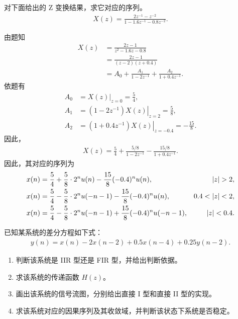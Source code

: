 \begin{exercise}
    对下面给出的 Z 变换结果，求它对应的序列。
    \begin{align*}
        X(z) = \frac{2z^{-1} - z^{-2}}{1 - 1.6z^{-1} - 0.8z^{-2}}.
    \end{align*}
\end{exercise}

\begin{solution}
    由题知
    \begin{align*}
        X(z) & = \frac{2z - 1}{z^2 - 1.6z - 0.8} \\
        & = \frac{2z - 1}{(z - 2)(z + 0.4)} \\
        & = A_0 + \frac{A_1}{1 - 2z^{-1}} + \frac{A_2}{1 + 0.4z^{-1}}.
    \end{align*}
    依题有
    \begin{align*}
        A_0 & = \left.X(z)\right|_{z = 0} = \frac{5}{4}, \\
        A_1 & = \left.(1 - 2z^{-1})X(z)\right|_{z = 2} = \frac{5}{8}, \\
        A_2 & = \left.(1 + 0.4z^{-1})X(z)\right|_{z = -0.4} = -\frac{15}{8}.
    \end{align*}
    因此，
    \begin{align*}
        X(z) = \frac{5}{4} + \frac{5/8}{1 - 2z^{-1}} - \frac{15/8}{1 + 0.4z^{-1}}.
    \end{align*}
    因此，其对应的序列为
    \begin{align*}
        x(n) & = \frac{5}{4} + \frac{5}{8}\cdot2^n u(n) - \frac{15}{8}(-0.4)^n u(n), & \left|z\right| > 2, \\
        x(n) & = \frac{5}{4} - \frac{5}{8}\cdot2^n u(-n - 1) - \frac{15}{8}(-0.4)^n u(n), & 0.4 < \left|z\right| < 2, \\
        x(n) & = \frac{5}{4} - \frac{5}{8}\cdot2^n u(-n - 1) + \frac{15}{8}(-0.4)^n u(-n - 1), & \left|z\right| < 0.4.
    \end{align*}
\end{solution}

\begin{exercise}
    已知某系统的差分方程如下式：
    \begin{align*}
        y(n) = x(n) - 2x(n - 2) + 0.5x(n - 4) + 0.25y(n - 2).
    \end{align*}
    \begin{enumerate}[label=(\arabic*)]
        \item 判断该系统是 IIR 型还是 FIR 型，并给出判断依据。
        \item 求该系统的传递函数 $H(z)$。
        \item 画出该系统的信号流图，分别给出直接 I 型和直接 II 型的实现。
        \item 求该系统对应的因果序列及其收敛域，并判断该状态下系统是否稳定。
    \end{enumerate}
\end{exercise}

